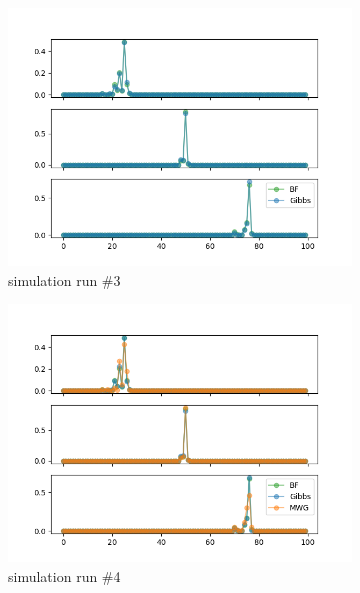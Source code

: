 \begin{figure}[H]
\begin{subfigure}{.3\textwidth}
	    \centering
    	\includegraphics[width=\linewidth]{../../plots/Posterior_post_burnin_M4_N100_NMCMC3_seed2_diffind2.png}
    	\caption{simulation run \#3}
	\end{subfigure}
	\begin{subfigure}{.3\textwidth}
	    \centering
    	\includegraphics[width=\linewidth]{../../plots/Posterior_post_burnin_M4_N100_NMCMC3_seed3_diffind2.png}
    	\caption{simulation run \#4}
	\end{subfigure}
	\begin{subfigure}{.3\textwidth}
	    \centering

\end{subfigure}
\end{figure}
